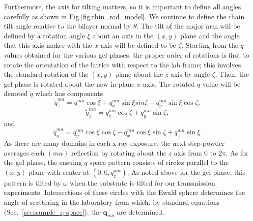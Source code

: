 Furthermore, the axis for tilting matters, so it is important to define all 
angles carefully as shown in Fig.\ref{fig:thin_rod_model}.  
We continue to define the chain tilt angle relative to the 
bilayer normal by $\theta$.  The tilt of the major arm will be defined by a 
rotation angle $\xi$ about an axis in the $(x,y)$ plane and the angle that 
this axis makes with the $x$ axis will be defined to be $\zeta$.  Starting 
from the $q$ values obtained for the various gel phases, the proper order of 
rotations is first to rotate the orientation of the lattice with respect to 
the lab frame; this involves the standard rotation of the $(x,y)$ plane about 
the $z$ axis by angle $\zeta$.  Then, the gel phase is rotated about the new 
in-plane $x$ axis. The rotated $q$ value will be denoted $\tilde{q}$ which 
has components
\begin{equation}\label{qtz}
  \tilde{q}_{z}^{mn}=q_{z}^{mn}\cos{\xi}+q_{x}^{mn}\sin{\xi}sin{\zeta}-q_{y}^{mn}\sin{\xi}\cos{\zeta},
\end{equation}
\begin{equation}\label{qtx}
  \tilde{q}_{x}^{mn}=q_{x}^{mn}\cos{\zeta}+q_{y}^{mn}\sin{\zeta},
\end{equation}
and
\begin{equation}\label{qty}
  \tilde{q}_{y}^{mn} = q_{y}^{mn}\cos\xi\cos\zeta -
                       q_{x}^{mn}\cos\xi\sin\zeta +
                       q_{z}^{mn}\sin\xi.
\end{equation}
As there are many domains in each x-ray exposure, the next step powder averages 
each $(mn)$ reflection by rotating about the $z$ axis from $0$ to $2\pi$.  
As for the gel phase, the ensuing $q$ space pattern consists of circles parallel 
to the $(x,y)$ plane with center at $(0, 0, q_z^{mn})$.  As noted above for the 
gel phase, this pattern is tilted by $\omega$ when the substrate is tilted for 
our transmission experiments.  Intersections of these circles with the Ewald 
sphere determines the angle of scattering in the laboratory from which, by 
standard equations (Sec.~\ref{sec:sample_q-space}), the $\mathbf{q}_{mn}$ are determined.  

